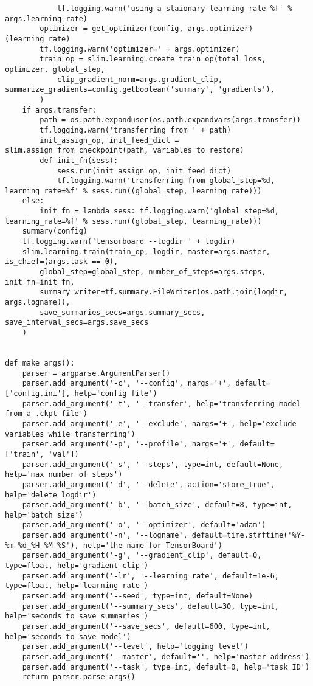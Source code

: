 \begin{lstlisting}
            tf.logging.warn('using a staionary learning rate %f' % args.learning_rate)
        optimizer = get_optimizer(config, args.optimizer)(learning_rate)
        tf.logging.warn('optimizer=' + args.optimizer)
        train_op = slim.learning.create_train_op(total_loss, optimizer, global_step,
            clip_gradient_norm=args.gradient_clip, summarize_gradients=config.getboolean('summary', 'gradients'),
        )
    if args.transfer:
        path = os.path.expanduser(os.path.expandvars(args.transfer))
        tf.logging.warn('transferring from ' + path)
        init_assign_op, init_feed_dict = slim.assign_from_checkpoint(path, variables_to_restore)
        def init_fn(sess):
            sess.run(init_assign_op, init_feed_dict)
            tf.logging.warn('transferring from global_step=%d, learning_rate=%f' % sess.run((global_step, learning_rate)))
    else:
        init_fn = lambda sess: tf.logging.warn('global_step=%d, learning_rate=%f' % sess.run((global_step, learning_rate)))
    summary(config)
    tf.logging.warn('tensorboard --logdir ' + logdir)
    slim.learning.train(train_op, logdir, master=args.master, is_chief=(args.task == 0),
        global_step=global_step, number_of_steps=args.steps, init_fn=init_fn,
        summary_writer=tf.summary.FileWriter(os.path.join(logdir, args.logname)),
        save_summaries_secs=args.summary_secs, save_interval_secs=args.save_secs
    )


def make_args():
    parser = argparse.ArgumentParser()
    parser.add_argument('-c', '--config', nargs='+', default=['config.ini'], help='config file')
    parser.add_argument('-t', '--transfer', help='transferring model from a .ckpt file')
    parser.add_argument('-e', '--exclude', nargs='+', help='exclude variables while transferring')
    parser.add_argument('-p', '--profile', nargs='+', default=['train', 'val'])
    parser.add_argument('-s', '--steps', type=int, default=None, help='max number of steps')
    parser.add_argument('-d', '--delete', action='store_true', help='delete logdir')
    parser.add_argument('-b', '--batch_size', default=8, type=int, help='batch size')
    parser.add_argument('-o', '--optimizer', default='adam')
    parser.add_argument('-n', '--logname', default=time.strftime('%Y-%m-%d_%H-%M-%S'), help='the name for TensorBoard')
    parser.add_argument('-g', '--gradient_clip', default=0, type=float, help='gradient clip')
    parser.add_argument('-lr', '--learning_rate', default=1e-6, type=float, help='learning rate')
    parser.add_argument('--seed', type=int, default=None)
    parser.add_argument('--summary_secs', default=30, type=int, help='seconds to save summaries')
    parser.add_argument('--save_secs', default=600, type=int, help='seconds to save model')
    parser.add_argument('--level', help='logging level')
    parser.add_argument('--master', default='', help='master address')
    parser.add_argument('--task', type=int, default=0, help='task ID')
    return parser.parse_args()


\end{lstlisting}
